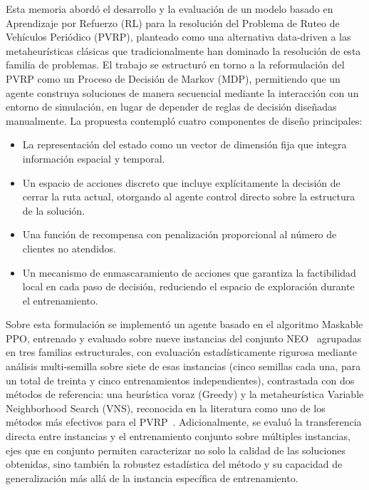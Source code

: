 


Esta memoria abordó el desarrollo y la evaluación de un modelo basado en Aprendizaje por Refuerzo (RL) para la resolución del Problema de Ruteo de Vehículos Periódico (PVRP), planteado como una alternativa data-driven a las metaheurísticas clásicas que tradicionalmente han dominado la resolución de esta familia de problemas. El trabajo se estructuró en torno a la reformulación del PVRP como un Proceso de Decisión de Markov (MDP), permitiendo que un agente construya soluciones de manera secuencial mediante la interacción con un entorno de simulación, en lugar de depender de reglas de decisión diseñadas manualmente. La propuesta contempló cuatro componentes de diseño principales: 

\begin{itemize}
    \item La representación del estado como un vector de dimensión fija que integra información espacial y temporal.
    
    \item Un espacio de acciones discreto que incluye explícitamente la decisión de cerrar la ruta actual, otorgando al agente control directo sobre la estructura de la solución.
    
    \item Una función de recompensa con penalización proporcional al número de clientes no atendidos.
    
    \item Un mecanismo de enmascaramiento de acciones que garantiza la factibilidad local en cada paso de decisión, reduciendo el espacio de exploración durante el entrenamiento.
\end{itemize}
 
Sobre esta formulación se implementó un agente basado en el algoritmo Maskable PPO, entrenado y evaluado sobre nueve instancias del conjunto NEO~\cite{NEO2013} agrupadas en tres familias estructurales, con evaluación estadísticamente rigurosa mediante análisis multi-semilla sobre siete de esas instancias (cinco semillas cada una, para un total de treinta y cinco entrenamientos independientes), contrastada con dos métodos de referencia: una heurística voraz (Greedy) y la metaheurística Variable Neighborhood Search (VNS), reconocida en la literatura como uno de los métodos más efectivos para el PVRP~\cite{HEMMELMAYR2009791}. Adicionalmente, se evaluó la transferencia directa entre instancias y el entrenamiento conjunto sobre múltiples instancias, ejes que en conjunto permiten caracterizar no solo la calidad de las soluciones obtenidas, sino también la robustez estadística del método y su capacidad de generalización más allá de la instancia específica de entrenamiento.

